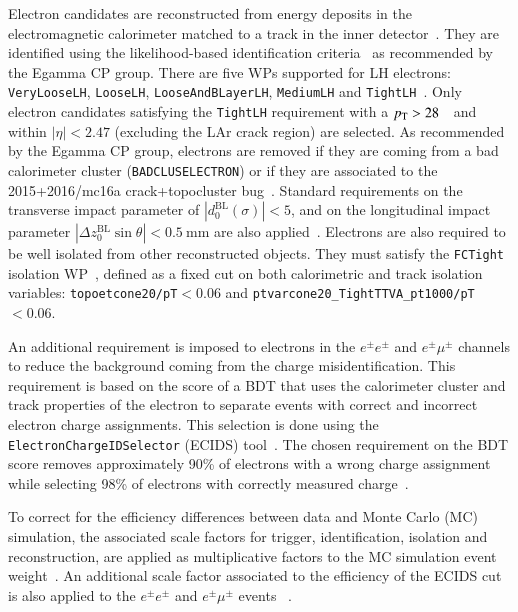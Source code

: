 %
Electron candidates are reconstructed from energy deposits in the electromagnetic calorimeter matched to a track in the inner detector~\cite{Aad:2019tso}. They are identified using the likelihood-based identification criteria~\cite{Aad:2019tso} as recommended by the Egamma CP group. There are five WPs supported for LH electrons: \texttt{VeryLooseLH},  \texttt{LooseLH}, \texttt{LooseAndBLayerLH}, \texttt{MediumLH} and \texttt{TightLH}~\cite{twiki:EGammaIdentificationRun2}.  Only electron candidates satisfying the  \texttt{TightLH}  requirement  with  a $p_{\text{T}}>28$~\GeV~and within  $|\eta|<2.47$ (excluding the LAr crack region) are selected. As recommended by the Egamma CP group, electrons are removed if they are coming from a bad calorimeter cluster (\texttt{BADCLUSELECTRON}) or if they are associated to the 2015+2016/mc16a crack+topocluster bug~\cite{twiki:EGammaIdentificationRun2}.  Standard requirements on the transverse impact parameter of $|d_{0}^{\text{BL}}(\sigma)| < 5$,  and on the longitudinal impact parameter  $|\Delta z_{0}^{\text{BL}} \sin{\theta}| < \SI[parse-numbers=false]{0.5}{\mm}$ are also applied~\cite{twiki:EGammaIdentificationRun2}.  Electrons are also required to be well isolated from other reconstructed objects. They must satisfy the \texttt{FCTight}  isolation WP~\cite{twiki:IsolationSelectionTool}, defined as a fixed cut on both calorimetric and track isolation variables: \texttt{topoetcone20/pT}$<0.06$ and \texttt{ptvarcone20\_TightTTVA\_pt1000/pT}$<0.06$.  

An additional requirement is imposed to electrons in the $e^\pm e^\pm$ and  $e^\pm \mu^\pm$ channels to reduce the background coming from the charge misidentification.  This requirement is based on the score of a BDT that uses the calorimeter cluster and track properties of the electron to separate events with correct and incorrect electron charge assignments. This selection is done using the \texttt{ElectronChargeIDSelector} (ECIDS) tool~\cite{twiki:ECIDSTool}. The chosen requirement on the BDT score removes approximately 90\% of electrons with a wrong charge assignment while selecting 98\% of electrons with correctly measured charge~\cite{Aad:2019tso}. 



To correct for the efficiency differences between data and Monte Carlo (MC) simulation, the associated scale factors for trigger, identification, isolation and reconstruction, are applied as multiplicative factors to the MC simulation event weight~\cite{twiki:ElectronEfficiencyRun2,twiki:LatestElectronRecomendations}. An additional scale factor associated to the efficiency of the ECIDS cut is also applied to the $e^\pm e^\pm$ and  $e^\pm \mu^\pm$ events ~\cite{twiki:LatestElectronRecomendations}. 

